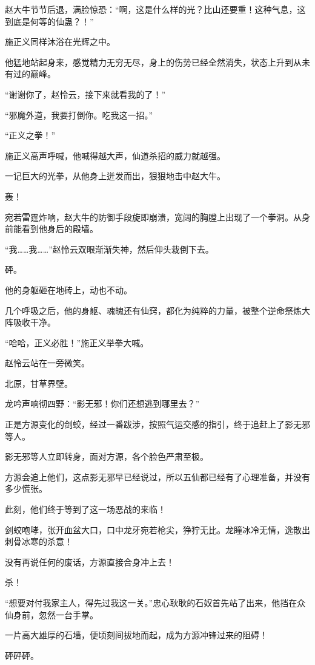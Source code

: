 \begin{this_body}
赵大牛节节后退，满脸惊恐：“啊，这是什么样的光？比山还要重！这种气息，这到底是何等的仙蛊？！”

施正义同样沐浴在光辉之中。

他猛地站起身来，感觉精力无穷无尽，身上的伤势已经全然消失，状态上升到从未有过的巅峰。

“谢谢你了，赵怜云，接下来就看我的了！”

“邪魔外道，我要打倒你。吃我这一招。”

“正义之拳！”

施正义高声呼喊，他喊得越大声，仙道杀招的威力就越强。

一记巨大的光拳，从他身上迸发而出，狠狠地击中赵大牛。

轰！

宛若雷霆炸响，赵大牛的防御手段旋即崩溃，宽阔的胸膛上出现了一个拳洞。从身前能看到他身后的殿墙。

“我……我……”赵怜云双眼渐渐失神，然后仰头栽倒下去。

砰。

他的身躯砸在地砖上，动也不动。

几个呼吸之后，他的身躯、魂魄还有仙窍，都化为纯粹的力量，被整个逆命祭炼大阵吸收干净。

“哈哈，正义必胜！”施正义举拳大喊。

赵怜云站在一旁微笑。

北原，甘草界壁。

龙吟声响彻四野：“影无邪！你们还想逃到哪里去？”

正是方源变化的剑蛟，经过一番跋涉，按照气运交感的指引，终于追赶上了影无邪等人。

影无邪等人立即转身，面对方源，各个脸色严肃至极。

方源会追上他们，这点影无邪早已经说过，所以五仙都已经有了心理准备，并没有多少慌张。

此刻，他们终于等到了这一场恶战的来临！

剑蛟咆哮，张开血盆大口，口中龙牙宛若枪尖，狰狞无比。龙瞳冰冷无情，逸散出刺骨冰寒的杀意！

没有再说任何的废话，方源直接合身冲上去！

杀！

“想要对付我家主人，得先过我这一关。”忠心耿耿的石奴首先站了出来，他挡在众仙身前，忽然一台手掌。

一片高大雄厚的石墙，便顷刻间拔地而起，成为方源冲锋过来的阻碍！

砰砰砰。


\end{this_body}
